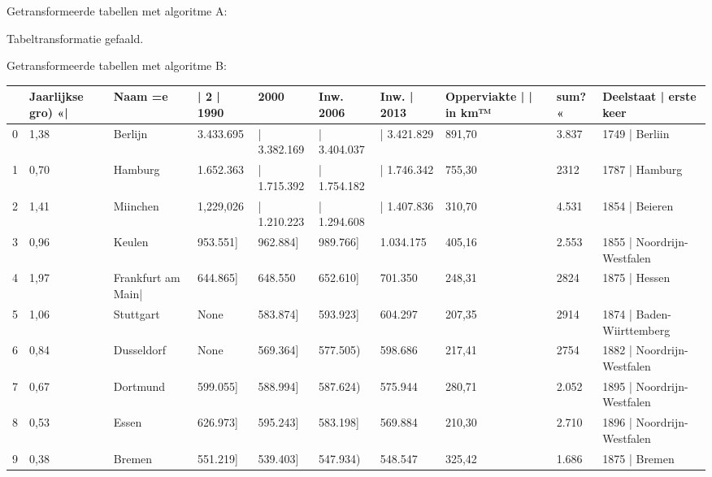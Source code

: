 Getransformeerde tabellen met algoritme A:

Tabeltransformatie gefaald.

Getransformeerde tabellen met algoritme B:

\begin{tabular}{llllllllll}
\toprule
{} & Jaarlijkse gro) «| &             Naam =e & | 2 | 1990 &         2000 &    Inw. 2006 &  Inw. | 2013 & Opperviakte | | in km™ & sum? « &      Deelstaat | erste keer \\
\midrule
0  &               1,38 &             Berlijn &  3.433.695 &  | 3.382.169 &  | 3.404.037 &  | 3.421.829 &                 891,70 &  3.837 &              1749 | Berliin \\
1  &               0,70 &             Hamburg &  1.652.363 &  | 1.715.392 &  | 1.754.182 &  | 1.746.342 &                 755,30 &   2312 &              1787 | Hamburg \\
2  &               1,41 &            Miinchen &  1,229,026 &  | 1.210.223 &  | 1.294.608 &  | 1.407.836 &                 310,70 &  4.531 &              1854 | Beieren \\
3  &               0,96 &              Keulen &   953.551] &     962.884] &     989.766] &    1.034.175 &                 405,16 &  2.553 &  1855 | Noordrijn-Westfalen \\
4  &               1,97 &  Frankfurt am Main| &   644.865] &      648.550 &     652.610] &      701.350 &                 248,31 &   2824 &               1875 | Hessen \\
5  &               1,06 &           Stuttgart &       None &     583.874] &     593.923] &      604.297 &                 207,35 &   2914 &   1874 | Baden-Wiirttemberg \\
6  &               0,84 &          Dusseldorf &       None &     569.364] &     577.505) &      598.686 &                 217,41 &   2754 &  1882 | Noordrijn-Westfalen \\
7  &               0,67 &            Dortmund &   599.055] &     588.994] &     587.624) &      575.944 &                 280,71 &  2.052 &  1895 | Noordrijn-Westfalen \\
8  &               0,53 &               Essen &   626.973] &     595.243] &     583.198] &      569.884 &                 210,30 &  2.710 &  1896 | Noordrijn-Westfalen \\
9  &               0,38 &              Bremen &   551.219] &     539.403] &     547.934) &      548.547 &                 325,42 &  1.686 &               1875 | Bremen \\

\end{tabular}
